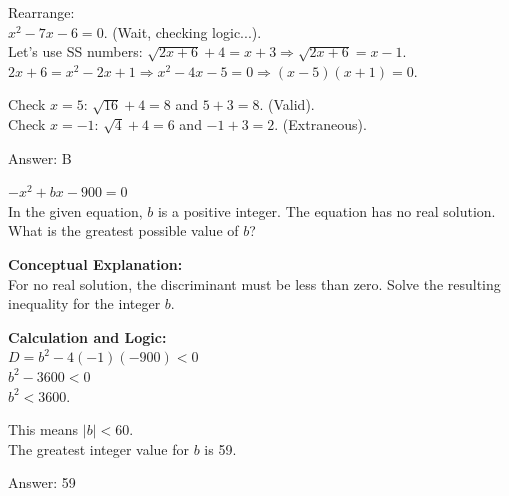 \documentclass[11pt,paper=a4,answers]{exam}
\begin{document}
\begin{questions}
\begin{solution}
\vspace{10pt}

Rearrange: \\
$x^2 - 7x - 6 = 0$. (Wait, checking logic...). \\
Let's use SS numbers: $\sqrt{2x+6} + 4 = x+3 \Rightarrow \sqrt{2x+6} = x-1$. \\
$2x+6 = x^2-2x+1 \Rightarrow x^2-4x-5=0 \Rightarrow (x-5)(x+1)=0$.

\vspace{10pt}

Check $x=5$: $\sqrt{16}+4=8$ and $5+3=8$. (Valid). \\
Check $x=-1$: $\sqrt{4}+4=6$ and $-1+3=2$. (Extraneous).

\vspace{25pt}

Answer: \colorbox{yellow!100}{B}
\end{solution}

\vspace{40pt}

\question
$-x^2 + bx - 900 = 0$ \\
In the given equation, $b$ is a positive integer. The equation has no real solution. What is the greatest possible value of $b$?

\begin{solution}
\textbf{Conceptual Explanation:} \\
For no real solution, the discriminant must be less than zero. Solve the resulting inequality for the integer $b$.

\vspace{20pt}

\textbf{Calculation and Logic:} \\
$D = b^2 - 4(-1)(-900) < 0$ \\
$b^2 - 3600 < 0$ \\
$b^2 < 3600$.

\vspace{10pt}

This means $|b| < 60$. \\
The greatest integer value for $b$ is 59.

\vspace{25pt}

Answer: \colorbox{yellow!100}{59}
\end{solution}



\end{questions}
\end{document}
